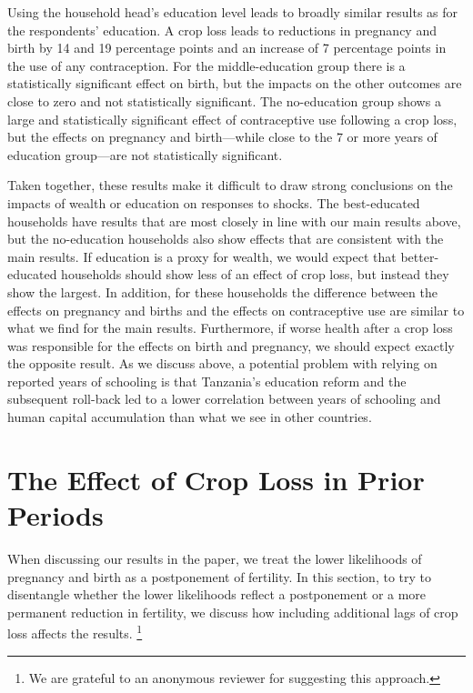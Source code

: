 \documentclass[letterpaper,12pt]{article}
\begin{document}
Using the household head's education level leads to broadly 
similar results as for the respondents' education. 
A crop loss leads to reductions in pregnancy and birth by
14 and 19 percentage points and an increase of 7 percentage points
in the use of any contraception.
For the middle-education group there is a statistically significant
effect on birth, but the impacts on the other outcomes are close to zero and
not statistically significant.
The no-education group shows a large and statistically significant
effect of contraceptive use following a crop loss, but the
effects on pregnancy and birth---while close to the 7 or more 
years of education group---are not statistically significant.

Taken together, these results make it difficult to draw strong
conclusions on the impacts of wealth or education on responses to shocks.
The best-educated households have results that are
most closely in line with our main results above, but 
the no-education households also show effects that are
consistent with the main results.
If education is a proxy for wealth, we would 
expect that better-educated households should show less
of an effect of crop loss, but instead they show the largest.
In addition, for these households the difference between
the effects on pregnancy and births and the effects on
contraceptive use are similar to what we find for the main results.
Furthermore, if worse health after a crop loss was responsible for the
effects on birth and pregnancy, we should expect exactly
the opposite result.
As we discuss above, a potential problem with relying on 
reported years of schooling is that Tanzania's education reform and the
subsequent roll-back led to a lower correlation between years of
schooling and human capital accumulation than what we see in other
countries.

\section{The Effect of Crop Loss in Prior Periods}

When discussing our results in the paper, we treat the 
lower likelihoods of pregnancy and birth as a postponement 
of fertility.
In this section, to try to disentangle whether the lower 
likelihoods reflect a postponement or a more permanent reduction 
in fertility, we discuss how including additional lags
of crop loss affects the results.%
\footnote{
We are grateful to an anonymous reviewer for suggesting 
this approach.
}
\end{document}
